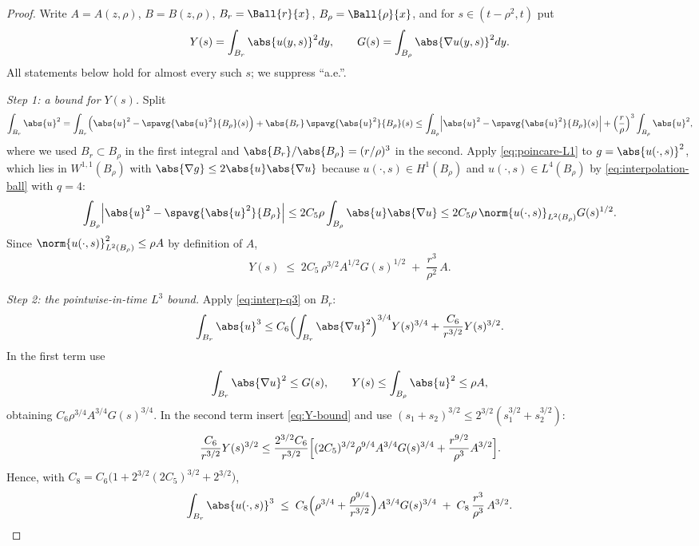 \documentclass[11pt,reqno]{amsart}
\begin{document}
\begin{proof}
Write $A=A(z,\rho)$, $B=B(z,\rho)$, $B_{r}=\Ball{r}{x}$, $B_{\rho}=\Ball{\rho}{x}$,
and for $s\in(t-\rho^{2},t)$ put
\[
  Y(s)=\int_{B_{r}}\abs{u(y,s)}^{2}dy,
  \qquad
  G(s)=\int_{B_{\rho}}\abs{\nabla u(y,s)}^{2}dy .
\]
All statements below hold for almost every such $s$; we suppress ``a.e.''.

\emph{Step 1: a bound for $Y(s)$.} Split
\[
  \int_{B_{r}}\abs{u}^{2}
  =\int_{B_{r}}\Bigl(\abs{u}^{2}-\spavg{\abs{u}^{2}}{B_{\rho}}(s)\Bigr)
   +\abs{B_{r}}\,\spavg{\abs{u}^{2}}{B_{\rho}}(s)
  \le\int_{B_{\rho}}\Bigl|\abs{u}^{2}-\spavg{\abs{u}^{2}}{B_{\rho}}(s)\Bigr|
   +\Bigl(\frac r\rho\Bigr)^{3}\int_{B_{\rho}}\abs{u}^{2},
\]
where we used $B_{r}\subset B_{\rho}$ in the first integral and
$\abs{B_{r}}/\abs{B_{\rho}}=(r/\rho)^{3}$ in the second. Apply
\eqref{eq:poincare-L1} to $g=\abs{u(\cdot,s)}^{2}$, which lies in
$W^{1,1}(B_{\rho})$ with $\abs{\nabla g}\le2\abs{u}\abs{\nabla u}$ because
$u(\cdot,s)\in H^{1}(B_{\rho})$ and $u(\cdot,s)\in L^{4}(B_{\rho})$ by
\eqref{eq:interpolation-ball} with $q=4$:
\[
  \int_{B_{\rho}}\Bigl|\abs{u}^{2}-\spavg{\abs{u}^{2}}{B_{\rho}}\Bigr|
  \le 2C_{5}\rho\int_{B_{\rho}}\abs{u}\abs{\nabla u}
  \le 2C_{5}\rho\,\norm{u(\cdot,s)}_{L^{2}(B_{\rho})}G(s)^{1/2} .
\]
Since $\norm{u(\cdot,s)}_{L^{2}(B_{\rho})}^{2}\le\rho A$ by definition of $A$,
\begin{equation}\label{eq:Y-bound}
  Y(s)\;\le\;2C_{5}\,\rho^{3/2}A^{1/2}G(s)^{1/2}
     \;+\;\frac{r^{3}}{\rho^{2}}\,A .
\end{equation}

\emph{Step 2: the pointwise-in-time $L^{3}$ bound.} Apply \eqref{eq:interp-q3}
on $B_{r}$:
\[
  \int_{B_{r}}\abs{u}^{3}
  \le C_{6}\Bigl(\int_{B_{r}}\abs{\nabla u}^{2}\Bigr)^{3/4}Y(s)^{3/4}
    +\frac{C_{6}}{r^{3/2}}Y(s)^{3/2} .
\]
In the first term use
\[
 \int_{B_{r}}\abs{\nabla u}^{2}\le G(s),
 \qquad Y(s)\le\int_{B_{\rho}}\abs{u}^{2}\le\rho A,
\]
obtaining
$C_{6}\rho^{3/4}A^{3/4}G(s)^{3/4}$. In the second term insert
\eqref{eq:Y-bound} and use
$(s_{1}+s_{2})^{3/2}\le2^{3/2}(s_{1}^{3/2}+s_{2}^{3/2})$:
\[
  \frac{C_{6}}{r^{3/2}}Y(s)^{3/2}
  \le\frac{2^{3/2}C_{6}}{r^{3/2}}
    \Bigl[(2C_{5})^{3/2}\rho^{9/4}A^{3/4}G(s)^{3/4}
      +\frac{r^{9/2}}{\rho^{3}}A^{3/2}\Bigr].
\]
Hence, with $C_{8}=C_{6}\bigl(1+2^{3/2}(2C_{5})^{3/2}+2^{3/2}\bigr)$,
\begin{equation}\label{eq:L3-pointwise}
  \int_{B_{r}}\abs{u(\cdot,s)}^{3}
  \;\le\;C_{8}\Bigl(\rho^{3/4}+\frac{\rho^{9/4}}{r^{3/2}}\Bigr)A^{3/4}G(s)^{3/4}
    \;+\;C_{8}\,\frac{r^{3}}{\rho^{3}}\,A^{3/2}.
\end{equation}


\end{proof}
\end{document}
